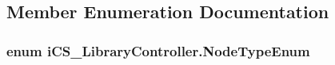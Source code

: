 \subsection{Member Enumeration Documentation}
\hypertarget{classi_c_s___library_controller_a9da5d971241a996d5f9a9fd1a784a562}{
\subsubsection[{Node\+Type\+Enum}]{\setlength{\rightskip}{0pt plus 5cm}enum {\bf i\+C\+S\+\_\+\+Library\+Controller.\+Node\+Type\+Enum}}}\label{classi_c_s___library_controller_a9da5d971241a996d5f9a9fd1a784a562}
